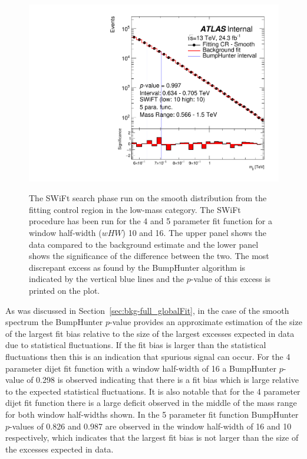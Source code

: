 \begin{figure}[!htb]
 {
  \includegraphics[width=0.45\linewidth, angle=0]{figs/Dibjet/LowMass/FitStudy_min566/bhFit_corrFitCR_smooth_5para_low10_high10.pdf}
}

\caption{\label{fig:bhFit_lm_corrFitCR_smooth}
  The SWiFt search phase run on the smooth distribution from the fitting control region in the low-mass category.
  The SWiFt procedure has been run for the 4 and 5 parameter fit function for a window half-width ($wHW$) 10 and 16.
  The upper panel shows the data compared to the background estimate and the lower panel shows the significance of the difference between the two.
  The most discrepant excess as found by the {\sc BumpHunter} algorithm is indicated by the vertical blue lines and the \mbox{$p$-value} of this excess is printed on the plot. }
\end{figure}

As was discussed in Section~\ref{sec:bkg-full_globalFit}, in the case of the smooth spectrum the {\sc BumpHunter} \mbox{$p$-value} provides an approximate estimation
of the size of the largest fit bias relative to the size of the largest excesses expected in data due to statistical fluctuations.
If the fit bias is larger than the statistical fluctuations then this is an indication that spurious signal can occur. 
For the 4 parameter dijet fit function with a window half-width of 16 a BumpHunter $p$-value of 0.298 is observed indicating that
there is a fit bias which is large relative to the expected statistical fluctuations.
It is also notable that for the 4 parameter dijet fit function there is a large deficit observed in the middle of the mass range for both window half-widths shown.
In the 5 parameter fit function BumpHunter $p$-values of 0.826 and 0.987 are observed in the window half-width of 16 and 10 respectively,
which indicates that the largest fit bias is not larger than the size of the excesses expected in data.

